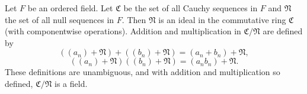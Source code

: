 Let $F$ be an ordered field. Let $\mathfrak{C}$ be the set of all Cauchy sequences in $F$ and $\mathfrak{N}$ the set of all null sequences in $F$. Then $\mathfrak{N}$ is an ideal in the commutative ring $\mathfrak{C}$ (with componentwise operations). Addition and multiplication in $\mathfrak{C}/\mathfrak{N}$ are defined by
$$((a_n) + \mathfrak{N}) + ((b_n) + \mathfrak{N}) = (a_n + b_n) + \mathfrak{N},$$
$$((a_n) + \mathfrak{N})((b_n) + \mathfrak{N}) = (a_n b_n) + \mathfrak{N}.$$
These definitions are unambiguous, and with addition and multiplication so defined, $\mathfrak{C}/\mathfrak{N}$ is a field.